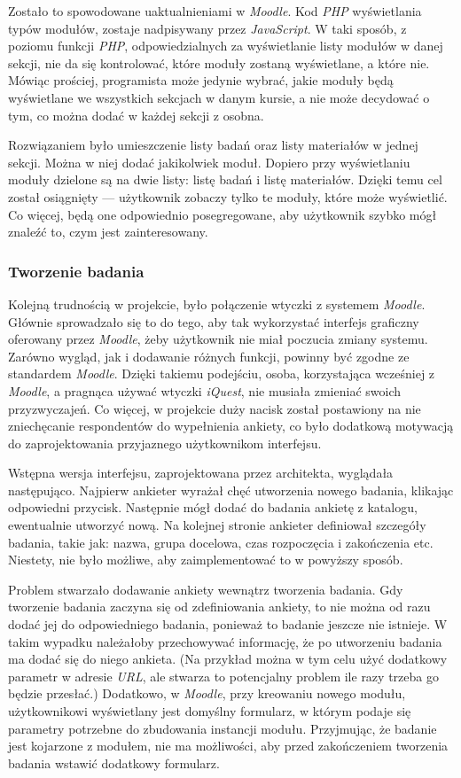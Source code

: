 \documentclass[12pt]{report}
\begin{document}
Zostało to spowodowane uaktualnieniami w \emph{Moodle}. Kod \emph{PHP} wyświetlania typów modułów, zostaje nadpisywany przez \emph{JavaScript}. W taki sposób, z poziomu funkcji \emph{PHP}, odpowiedzialnych za wyświetlanie listy modułów w danej sekcji, nie da się kontrolować, które moduły zostaną wyświetlane, a które nie. Mówiąc prościej, programista może jedynie wybrać, jakie moduły będą wyświetlane we wszystkich sekcjach w danym kursie, a nie może decydować o tym, co można dodać w każdej sekcji z osobna.

Rozwiązaniem było umieszczenie listy badań oraz listy materiałów w jednej sekcji. Można w niej dodać jakikolwiek moduł. Dopiero przy wyświetlaniu moduły dzielone są na dwie listy: listę badań i listę materiałów. Dzięki temu cel został osiągnięty --- użytkownik zobaczy tylko te moduły, które może wyświetlić. Co więcej, będą one odpowiednio posegregowane, aby użytkownik szybko mógł znaleźć to, czym jest zainteresowany.

\subsubsection{Tworzenie badania}
Kolejną trudnością w projekcie, było połączenie wtyczki z systemem \emph{Moodle}. Głównie sprowadzało się to do tego, aby tak wykorzystać interfejs graficzny oferowany przez \emph{Moodle}, żeby użytkownik nie miał poczucia zmiany systemu. Zarówno wygląd, jak i dodawanie różnych funkcji, powinny być zgodne ze standardem \emph{Moodle}. Dzięki takiemu podejściu, osoba, korzystająca wcześniej z \emph{Moodle}, a pragnąca używać wtyczki \emph{iQuest}, nie musiała zmieniać swoich przyzwyczajeń. Co więcej, w projekcie duży nacisk został postawiony na nie zniechęcanie respondentów do wypełnienia ankiety, co było dodatkową motywacją do zaprojektowania przyjaznego użytkownikom interfejsu.

Wstępna wersja interfejsu, zaprojektowana przez architekta, wyglądała następująco. Najpierw ankieter wyrażał chęć utworzenia nowego badania, klikając odpowiedni przycisk. Następnie mógł dodać do badania ankietę z katalogu, ewentualnie utworzyć nową. Na kolejnej stronie ankieter definiował szczegóły badania, takie jak: nazwa, grupa docelowa, czas rozpoczęcia i zakończenia etc. Niestety, nie było możliwe, aby zaimplementować to w powyższy sposób.

Problem stwarzało dodawanie ankiety wewnątrz tworzenia badania. Gdy tworzenie badania zaczyna się od zdefiniowania ankiety, to nie można od razu dodać jej do odpowiedniego badania, ponieważ to badanie jeszcze nie istnieje. W takim wypadku należałoby przechowywać informację, że po utworzeniu badania ma dodać się do niego ankieta. (Na przykład można w tym celu użyć dodatkowy parametr w adresie \emph{URL}, ale stwarza to potencjalny problem ile razy trzeba go będzie przesłać.) Dodatkowo, w \emph{Moodle}, przy kreowaniu nowego modułu, użytkownikowi wyświetlany jest domyślny formularz, w którym podaje się parametry potrzebne do zbudowania instancji modułu. Przyjmując, że badanie jest kojarzone z modułem, nie ma możliwości, aby przed zakończeniem tworzenia badania wstawić dodatkowy formularz.
\end{document}
